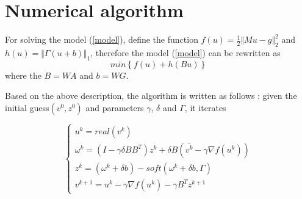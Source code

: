 \documentclass[UTF8]{article}
\begin{document}
\section{Numerical algorithm}
\par For solving the model (\ref{model}), define the function $f(u) = \frac{1}{2}\Vert Mu-g \Vert_2^2 $ and $h(u) = \Vert \Gamma(u+b) \Vert_1$, therefore the model (\ref{model}) can be rewritten as
\begin{equation}
	min \left\{ f(u) + h(Bu)  \right\} 
\end{equation}
where the $B=WA$ and $b = WG$.
\par Based on the above description, the algorithm is written as follows : given the initial guess$(v^0, z^0)$ and parameters $\gamma$, $\delta$ and $\Gamma$, it iterates

\begin{equation*}
	\begin{cases}
	 u^k = real(v^k) \\
	 \omega^k = (I-\gamma \delta BB^T)z^k + \delta B(\bar{v^k} - \gamma \nabla f(u^k))\\
	 z^k = ( \omega^k+\delta b) - soft(\omega^k+\delta b, \Gamma) \\
	 v^{k+1} = u^k - \gamma \nabla f(u^k) - \gamma B^T z^{k+1}
	\end{cases}
\end{equation*}
\end{document}
